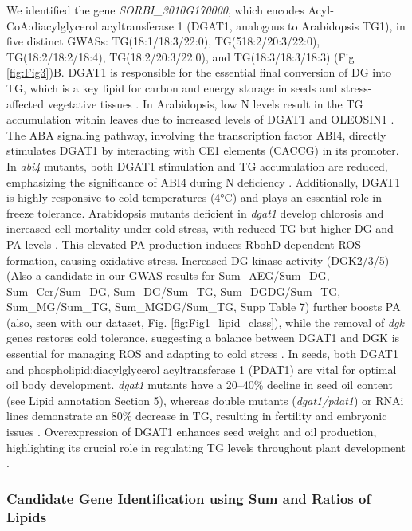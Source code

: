 \documentclass[10pt,letterpaper]{article}
\begin{document}
\begin{itemize}
We identified the gene \textit{SORBI\_3010G170000}, which encodes Acyl‐CoA:diacylglycerol acyltransferase 1 (DGAT1, analogous to Arabidopsis TG1), in five distinct GWASs: TG(18:1/18:3/22:0), TG(518:2/20:3/22:0), TG(18:2/18:2/18:4), TG(18:2/20:3/22:0), and TG(18:3/18:3/18:3) (Fig \ref{fig:Fig3})B. DGAT1 is responsible for the essential final conversion of DG into TG, which is a key lipid for carbon and energy storage in seeds and stress-affected vegetative tissues \cite{Zhang2009,Yang2011}. In Arabidopsis, low N levels result in the TG accumulation within leaves due to increased levels of DGAT1 and OLEOSIN1 \cite{Yang2011}. The ABA signaling pathway, involving the transcription factor ABI4, directly stimulates DGAT1 by interacting with CE1 elements (CACCG) in its promoter. In \emph{abi4} mutants, both DGAT1 stimulation and TG accumulation are reduced, emphasizing the significance of ABI4 during N deficiency \cite{Yang2011}. Additionally, DGAT1 is highly responsive to cold temperatures (4°C) and plays an essential role in freeze tolerance. Arabidopsis mutants deficient in \emph{dgat1} develop chlorosis and increased cell mortality under cold stress, with reduced TG but higher DG and PA levels \cite{Tan2018}. This elevated PA production induces RbohD-dependent ROS formation, causing oxidative stress. Increased DG kinase activity (DGK2/3/5) (Also a candidate in our GWAS results for Sum\_AEG/Sum\_DG, Sum\_Cer/Sum\_DG, Sum\_DG/Sum\_TG, Sum\_DGDG/Sum\_TG, Sum\_MG/Sum\_TG, Sum\_MGDG/Sum\_TG, Supp Table 7) further boosts PA (also, seen with our dataset, Fig. \ref{fig:Fig1_lipid_class}), while the removal of \emph{dgk} genes restores cold tolerance, suggesting a balance between DGAT1 and DGK is essential for managing ROS and adapting to cold stress \cite{Tan2018}. In seeds, both DGAT1 and phospholipid:diacylglycerol acyltransferase 1 (PDAT1) are vital for optimal oil body development. \emph{dgat1} mutants have a 20–40\% decline in seed oil content (see Lipid annotation Section 5), whereas double mutants (\emph{dgat1/pdat1}) or RNAi lines demonstrate an 80\% decrease in TG, resulting in fertility and embryonic issues \cite{Zhang2009}. Overexpression of DGAT1 enhances seed weight and oil production, highlighting its crucial role in regulating TG levels throughout plant development \cite{Zhang2009,Yang2011}.


\subsubsection*{Candidate Gene Identification using Sum and Ratios of Lipids}

\end{itemize}
\end{document}
